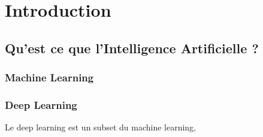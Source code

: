 \chapter{Introduction}

\section{Qu'est ce que l'Intelligence Artificielle ?}

\subsection{Machine Learning}


\subsection{Deep Learning}
Le deep learning est un subset du machine learning, 